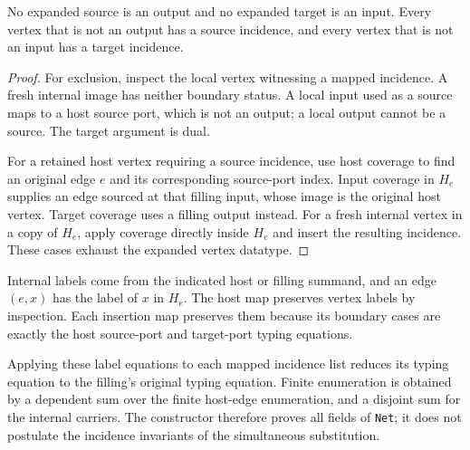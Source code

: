 \begin{lemma}
No expanded source is an output and no expanded target is an input. Every
vertex that is not an output has a source incidence, and every vertex that
is not an input has a target incidence.
\end{lemma}
\begin{proof}
For exclusion, inspect the local vertex witnessing a mapped incidence. A
fresh internal image has neither boundary status. A local input used as a
source maps to a host source port, which is not an output; a local output
cannot be a source. The target argument is dual.

For a retained host vertex requiring a source incidence, use host coverage
to find an original edge $e$ and its corresponding source-port index. Input
coverage in $H_e$ supplies an edge sourced at that filling input, whose image
is the original host vertex. Target coverage uses a filling output instead.
For a fresh internal vertex in a copy of $H_e$, apply coverage directly
inside $H_e$ and insert the resulting incidence. These cases exhaust the
expanded vertex datatype.
\end{proof}

Internal labels come from the indicated host or filling summand, and an edge
$(e,x)$ has the label of $x$ in $H_e$. The host map preserves vertex labels
by inspection. Each insertion map preserves them because its boundary cases
are exactly the host source-port and target-port typing equations.

Applying these label equations to each mapped incidence list reduces its
typing equation to the filling's original typing equation. Finite enumeration
is obtained by a dependent sum over the finite host-edge enumeration, and a
disjoint sum for the internal carriers. The constructor therefore proves all
fields of \texttt{Net}; it does not postulate the incidence invariants of the
simultaneous substitution.

